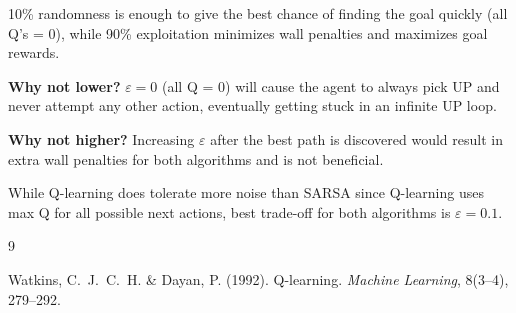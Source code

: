 \documentclass[11pt,a4paper]{article}
\begin{document}
10\% randomness is enough to give the best chance of finding the goal quickly (all Q's = 0), while 90\% exploitation minimizes wall penalties and maximizes goal rewards.

\textbf{Why not lower?} $\varepsilon = 0$ (all Q = 0) will cause the agent to always pick UP and never attempt any other action, eventually getting stuck in an infinite UP loop.

\textbf{Why not higher?} Increasing $\varepsilon$ after the best path is discovered would result in extra wall penalties for both algorithms and is not beneficial.

While Q-learning does tolerate more noise than SARSA since Q-learning uses max Q for all possible next actions, best trade-off for both algorithms is \textbf{$\varepsilon = 0.1$}.

\begin{thebibliography}{9}

Watkins, C.~J.~C.~H. \& Dayan, P. (1992).
Q-learning.
\textit{Machine Learning}, 8(3--4), 279--292.

\end{thebibliography}
\end{document}
